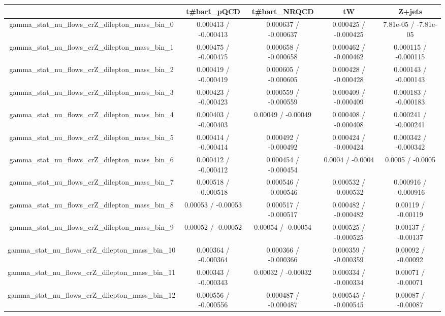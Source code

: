 \documentclass[10pt]{article}
\begin{document}
\begin{table}[htbp]
\begin{center}
\begin{tabular}{|c|c|c|c|c|}
\hline 
      & t#bar{t}_{pQCD}      & t#bar{t}_{NRQCD}      & tW      & Z+jets \\ 
\hline 
  gamma_stat_nu_flows_crZ_dilepton_mass_bin_0 & 0.000413 / -0.000413 & 0.000637 / -0.000637 & 0.000425 / -0.000425 & 7.81e-05 / -7.81e-05 \\ 
  gamma_stat_nu_flows_crZ_dilepton_mass_bin_1 & 0.000475 / -0.000475 & 0.000658 / -0.000658 & 0.000462 / -0.000462 & 0.000115 / -0.000115 \\ 
  gamma_stat_nu_flows_crZ_dilepton_mass_bin_2 & 0.000419 / -0.000419 & 0.000605 / -0.000605 & 0.000428 / -0.000428 & 0.000143 / -0.000143 \\ 
  gamma_stat_nu_flows_crZ_dilepton_mass_bin_3 & 0.000423 / -0.000423 & 0.000559 / -0.000559 & 0.000409 / -0.000409 & 0.000183 / -0.000183 \\ 
  gamma_stat_nu_flows_crZ_dilepton_mass_bin_4 & 0.000403 / -0.000403 & 0.00049 / -0.00049 & 0.000408 / -0.000408 & 0.000241 / -0.000241 \\ 
  gamma_stat_nu_flows_crZ_dilepton_mass_bin_5 & 0.000414 / -0.000414 & 0.000492 / -0.000492 & 0.000424 / -0.000424 & 0.000342 / -0.000342 \\ 
  gamma_stat_nu_flows_crZ_dilepton_mass_bin_6 & 0.000412 / -0.000412 & 0.000454 / -0.000454 & 0.0004 / -0.0004 & 0.0005 / -0.0005 \\ 
  gamma_stat_nu_flows_crZ_dilepton_mass_bin_7 & 0.000518 / -0.000518 & 0.000546 / -0.000546 & 0.000532 / -0.000532 & 0.000916 / -0.000916 \\ 
  gamma_stat_nu_flows_crZ_dilepton_mass_bin_8 & 0.00053 / -0.00053 & 0.000517 / -0.000517 & 0.000482 / -0.000482 & 0.00119 / -0.00119 \\ 
  gamma_stat_nu_flows_crZ_dilepton_mass_bin_9 & 0.00052 / -0.00052 & 0.00054 / -0.00054 & 0.000525 / -0.000525 & 0.00137 / -0.00137 \\ 
  gamma_stat_nu_flows_crZ_dilepton_mass_bin_10 & 0.000364 / -0.000364 & 0.000366 / -0.000366 & 0.000359 / -0.000359 & 0.00092 / -0.00092 \\ 
  gamma_stat_nu_flows_crZ_dilepton_mass_bin_11 & 0.000343 / -0.000343 & 0.00032 / -0.00032 & 0.000334 / -0.000334 & 0.00071 / -0.00071 \\ 
  gamma_stat_nu_flows_crZ_dilepton_mass_bin_12 & 0.000556 / -0.000556 & 0.000487 / -0.000487 & 0.000545 / -0.000545 & 0.00087 / -0.00087 \\ 

\end{tabular}
\end{center}
\end{table}
\end{document}
